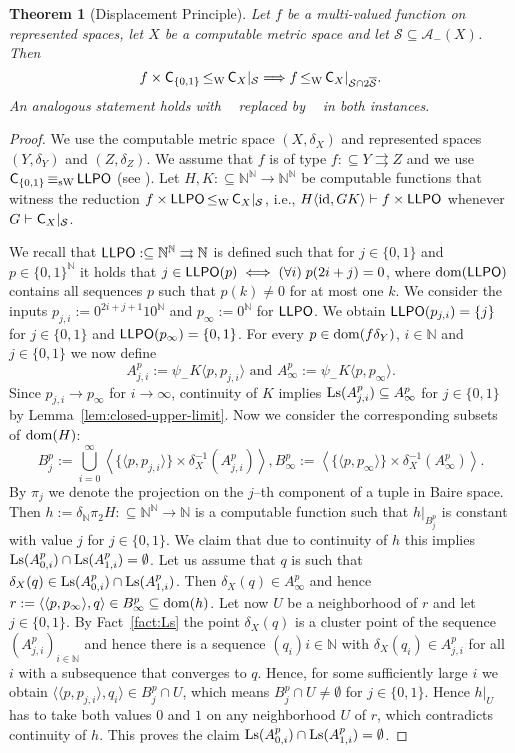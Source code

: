 \documentclass[a4paper]{amsart}
\def\AA{{\mathcal A}}
\def\SS{{\mathcal S}}
\def\IN{{\mathbb{N}}}
\def\TO{\Longrightarrow}
\def\In{\subseteq}
\def\mto{\rightrightarrows}
\def\id{{\rm id}}
\def\dom{{\rm dom}}
\def\Ls{{\rm Ls}}
\def\LLPO{\text{\rm\sffamily LLPO}}
\def\C{\mbox{\rm\sffamily C}}
\def\LLPO{\mbox{\rm\sffamily LLPO}}
\def\leqW{\mathop{\leq_{\mathrm{W}}}}
\def\leqSW{\mathop{\leq_{\mathrm{sW}}}}
\def\equivSW{\mathop{\equiv_{\mathrm{sW}}}}
\newtheorem{theorem}{Theorem}[section]
\theoremstyle{definition}
\begin{document}
\begin{theorem}[Displacement Principle]
Let $f$ be a multi-valued function on represented spaces, let $X$ be a computable metric space
and let $\SS\In\AA_-(X)$. Then
\[f\times\C_{\{0,1\}}\leqW\C_X|_\SS\TO f\leqW\C_X|_{\SS\cap2\overline{\SS}}.\]
An analogous statement holds with $\leqW$ replaced by $\leqSW$ in both instances.
\end{theorem}
\begin{proof}
We use the computable metric space $(X,\delta_X)$ and represented spaces $(Y,\delta_Y)$ and $(Z,\delta_Z)$.
We assume that $f$ is of type $f:\In Y\mto Z$ and we use $\C_{\{0,1\}}\equivSW\LLPO$ (see \cite{BBP12}).
Let $H,K:\In\IN^\IN\to\IN^\IN$ be computable functions that witness the reduction $f\times\LLPO\leqW\C_X|_\SS$,
i.e., $H\langle\id,GK\rangle\vdash f\times\LLPO$ whenever $G\vdash\C_X|_\SS$.

We recall that $\LLPO:\In\IN^\IN\mto\IN$ is defined such that for $j\in\{0,1\}$ and $p\in\{0,1\}^\IN$ it holds that
$j\in\LLPO(p)\iff(\forall i)\;p(2i+j)=0$,
where $\dom(\LLPO)$ contains all sequences $p$ such that $p(k)\not=0$ for at most one $k$.
We consider the inputs $p_{j,i}:=0^{2i+j+1}10^\IN$ and $p_\infty:=0^\IN$ for $\LLPO$.
We obtain $\LLPO(p_{j,i})=\{j\}$ for $j\in\{0,1\}$ and $\LLPO(p_\infty)=\{0,1\}$.
For every $p\in\dom(f\delta_Y)$, $i\in\IN$ and $j\in\{0,1\}$ we now define
\[A_{j,i}^p:=\psi_-K\langle p,p_{j,i}\rangle\mbox{ and }A_\infty^p:=\psi_-K\langle p,p_\infty\rangle.\]
Since $p_{j,i}\to p_\infty$ for $i\to\infty$, continuity of $K$ implies $\Ls(A_{j,i}^p)\In A_\infty^p$ for $j\in\{0,1\}$
by Lemma~\ref{lem:closed-upper-limit}. Now we consider the corresponding subsets of $\dom(H)$:
\[B_j^p:=\bigcup_{i=0}^\infty\left\langle\{\langle p,p_{j,i}\rangle\}\times\delta_X^{-1}(A_{j,i}^p)\right\rangle,
  B_\infty^p:=\left\langle\{\langle p,p_\infty\rangle\}\times\delta_X^{-1}(A_\infty^p)\right\rangle.
\]
By $\pi_j$ we denote the projection on the $j$--th component of a tuple in Baire space.
Then $h:=\delta_\IN\pi_2 H:\In\IN^\IN\to\IN$ is a computable function such that 
$h|_{B_j^p}$ is constant with value $j$ for $j\in\{0,1\}$. 
We claim that due to continuity of $h$ this implies $\Ls(A_{0,i}^p)\cap\Ls(A_{1,i}^p)=\emptyset$.
Let us assume that $q$ is such that $\delta_X(q)\in\Ls(A_{0,i}^p)\cap\Ls(A_{1,i}^p)$.
Then $\delta_X(q)\in A_\infty^p$ and hence $r:=\langle\langle p,p_\infty\rangle,q\rangle\in B_\infty^p\In\dom(h)$.
Let now $U$ be a neighborhood of $r$ and let $j\in\{0,1\}$.
By Fact~\ref{fact:Ls} the point $\delta_X(q)$ is a cluster point of the sequence $(A_{j,i}^p)_{i\in\IN}$ and hence
there is a sequence $(q_i){i\in\IN}$ with $\delta_X(q_i)\in A_{j,i}^p$ for all $i$ with a subsequence that converges to $q$.
Hence, for some sufficiently large $i$ we obtain $\langle\langle p,p_{j,i}\rangle,q_i\rangle\in B_j^p\cap U$, 
which means $B_j^p\cap U\not=\emptyset$ for $j\in\{0,1\}$.
Hence $h|_U$ has to take both values $0$ and $1$ on any neighborhood $U$ of $r$, which contradicts continuity of $h$. 
This proves the claim $\Ls(A_{0,i}^p)\cap\Ls(A_{1,i}^p)=\emptyset$.


\end{proof}
\end{document}
